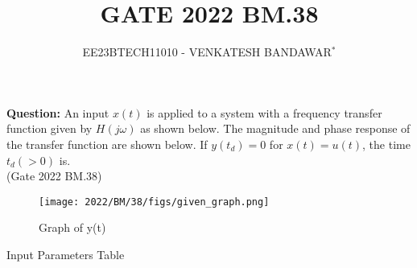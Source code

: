 \documentclass[journal,12pt,twocolumn]{IEEEtran}
\theoremstyle{remark}
\begin{document}

\vspace{3cm}

\title{GATE 2022 BM.38}
\author{EE23BTECH11010 - VENKATESH BANDAWAR$^{*}$%
}
\maketitle
\newpage
\bigskip
\textbf{Question:} An input $x(t)$ is applied to a system with a frequency transfer function given by
$H(j\omega)$ as shown below. The magnitude and phase response of the transfer function
are shown below. If $y(t_d) = 0$ for $x(t) = u(t)$, the time $t_d (> 0)$ is.\\ 
\hfill(Gate 2022 BM.38)
\begin{figure}[!h] 
\centering
\texttt{[image: 2022/BM/38/figs/given\_graph.png]}
\caption{Graph of y(t)}
\label{fig:Graph1_gate_BM_38}
\end{figure}

\solution 
\fi
\begin{table}[!h]
    \centering
    
    \caption{Input Parameters Table}
\end{table}
\end{document}
